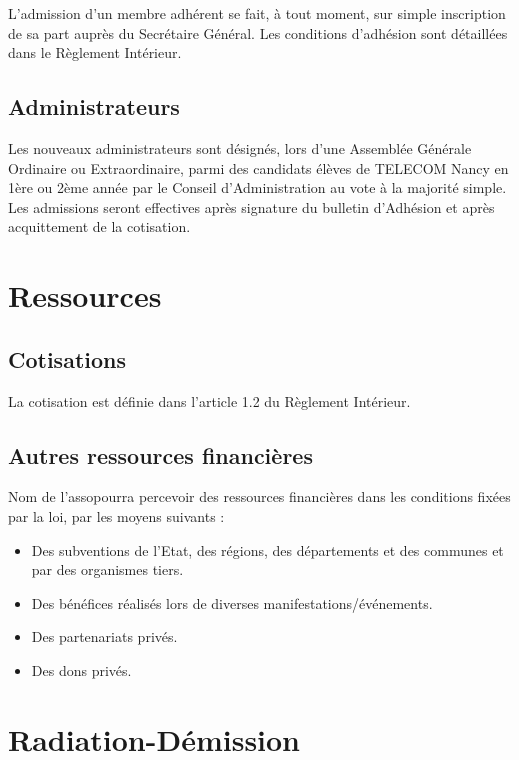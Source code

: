 \documentclass[12pt]{article}
\newcommand{\asso}{Nom de l'asso}
\begin{document}
L’admission d’un membre adhérent se fait, à tout moment, sur simple inscription de sa part auprès du
Secrétaire Général. Les conditions d’adhésion sont détaillées dans le Règlement Intérieur.

\subsection{Administrateurs}
\label{sec:admission:administrateurs}

Les nouveaux administrateurs sont désignés, lors d’une Assemblée Générale Ordinaire ou Extraordinaire,
parmi des candidats élèves de TELECOM Nancy en 1ère ou 2ème année par le Conseil d’Administration au vote
à la majorité simple.
Les admissions seront effectives après signature du bulletin d’Adhésion et après acquittement de la
cotisation.

\section{Ressources}
\label{sec:ressources}

\subsection{Cotisations}
\label{sec:ressources:cotisations}

La cotisation est définie dans l’article 1.2 du Règlement Intérieur.

\subsection{Autres ressources financières}
\label{sec:ressources:autres}
\asso pourra percevoir des ressources financières dans les conditions fixées par la loi, par les moyens suivants :
\begin{itemize}
    \item Des subventions de l'Etat, des régions, des départements et des communes et par des organismes tiers.
    \item Des bénéfices réalisés lors de diverses manifestations/événements.
    \item Des partenariats privés.
    \item Des dons privés.
\end{itemize}



\section{Radiation-Démission}
\label{sec:radiation}
\end{document}

